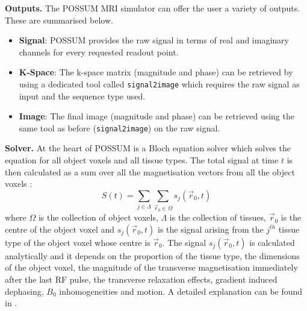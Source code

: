 \hfill

\textbf{Outputs.} The POSSUM MRI simulator can offer the user a variety of outputs.
These are summarised below.
\begin{itemize}
    
    \item \textbf{Signal}: POSSUM provides the raw signal in terms of real and imaginary channels for every requested readout point.
    
    \item \textbf{K-Space}: The k-space matrix (magnitude and phase) can be retrieved by using a dedicated tool called \texttt{signal2image} which requires the raw signal as input and the sequence type used.
    
    \item \textbf{Image}: The final image (magnitude and phase) can be retrieved using the same tool as before (\texttt{signal2image}) on the raw signal.
    
\end{itemize}

\hfill

\textbf{Solver.} At the heart of POSSUM is a Bloch equation solver which solves the equation for all object voxels and all tissue types.
The total signal at time $t$ is then calculated as a sum over all the magnetisation vectors from all the object voxels \cite{Drobnjak2006}:
\begin{equation}
    S(t) = \sum_{j \in \Lambda} \sum_{\vec{r}_0 \in \Omega} s_j (\vec{r}_0, t)
\end{equation}
where $\Omega$ is the collection of object voxels, $\Lambda$ is the collection of tissues, $\vec{r}_0$ is the centre of the object voxel and $s_j(\vec{r}_0, t)$ is the signal arising from the $j^{th}$ tissue type of the object voxel whose centre is $\vec{r}_0$.
The signal $s_j(\vec{r}_0, t)$ is calculated analytically and it depends on the proportion of the tissue type, the dimensions of the object voxel, the magnitude of the transverse magnetisation immediately after the last RF pulse, the transverse relaxation effects, gradient induced dephasing, $B_0$ inhomogeneities and motion.
A detailed explanation can be found in \cite{Drobnjak2006}.


